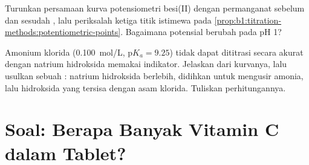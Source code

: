 \begin{exercise}[$\star\star\star$]\label{exo:b1:titration-methods:11}
Turunkan persamaan kurva potensiometri besi(II) dengan permanganat
sebelum dan sesudah , lalu periksalah ketiga titik istimewa
pada \cref{prop:b1:titration-methods:potentiometric-points}. Bagaimana
potensial  berubah pada pH 1?
\end{exercise}

\begin{exercise}[$\star\star\star$]\label{exo:b1:titration-methods:12}
Amonium klorida (\qty{0.100}{mol/L}, $\mathrm{p}K_a = 9.25$) tidak dapat
dititrasi secara akurat dengan natrium hidroksida memakai indikator.
Jelaskan dari kurvanya, lalu usulkan sebuah : natrium
hidroksida berlebih, didihkan untuk mengusir amonia, lalu 
hidroksida yang tersisa dengan asam klorida. Tuliskan perhitungannya.
\end{exercise}

\section{Soal: Berapa Banyak Vitamin C dalam Tablet?}

